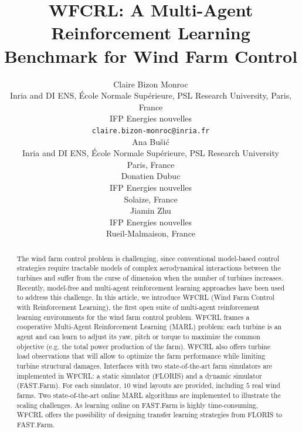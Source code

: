 \documentclass{article}
\title{WFCRL: A Multi-Agent Reinforcement Learning Benchmark for Wind Farm Control}
\author{%
  Claire Bizon Monroc \\
  Inria and DI ENS, \'Ecole Normale Sup\'erieure, PSL Research University, Paris, France \\
  IFP Energies nouvelles\\
  \texttt{claire.bizon-monroc@inria.fr} \\
  \And
  Ana Bu\v{s}i\'c \\
  Inria and DI ENS, \'Ecole Normale Sup\'erieure, PSL Research University \\
  Paris, France \\ 
  \AND
  Donatien Dubuc \\ 
  IFP Energies nouvelles \\ 
  Solaize, France \\ 
  \And
  Jiamin Zhu \\ 
   IFP Energies nouvelles \\
  Rueil-Malmaison, France \\ 
}
\begin{document}
\maketitle


\begin{abstract}
The wind farm control problem is challenging, since conventional model-based control strategies require tractable models of complex aerodynamical interactions between the turbines and suffer from the curse of dimension when the number of turbines increases. Recently, model-free and multi-agent reinforcement learning approaches have been used to address this challenge. In this article, we introduce WFCRL (Wind Farm Control with Reinforcement Learning), the first open suite of multi-agent reinforcement learning environments for the wind farm control problem. WFCRL frames a cooperative Multi-Agent Reinforcement Learning (MARL) problem: each turbine is an agent and can learn to adjust its yaw, pitch or torque to maximize the common objective (e.g. the total power production of the farm). WFCRL also offers turbine load observations that will allow to optimize the farm performance while limiting turbine structural damages. Interfaces with two state-of-the-art farm simulators are implemented in WFCRL: a static simulator (FLORIS) and a dynamic simulator (FAST.Farm). For each simulator, $10$ wind layouts are provided, including $5$ real wind farms. Two state-of-the-art online MARL algorithms are implemented to illustrate the scaling challenges. As learning online on FAST.Farm is highly time-consuming, WFCRL offers the possibility of designing transfer learning strategies from FLORIS to FAST.Farm.



\end{abstract}
\end{document}
